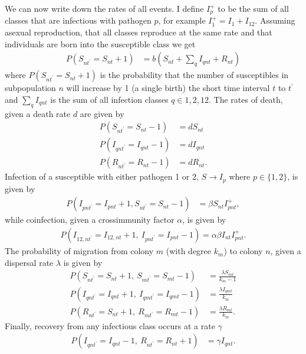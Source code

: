 We can now write down the rates of all events. I define $I^+_p$ to be the sum of all classes that are infectious with pathogen $p$, for example $I^+_1 = I_1 + I_{12}$. Assuming asexual reproduction, that all classes reproduce at the same rate and that individuals are born into the susceptible class we get
\begin{align}
P\left( S_{nt^\prime} = S_{nt} +1\right) &= b\left( S_{nt}+\sum_q I_{qnt} + R_{nt}\right) 
\end{align}
where $P\left( S_{nt^\prime} = S_{nt} +1\right)$ is the probability that the number of susceptibles in subpopulation $n$ will increase by 1 (a single birth) the short time interval $t$ to $t^\prime$ and $\sum_q I_{qnt}$ is the sum of all infection classes $q \in {1, 2, 12}$.
The rates of death, given a death rate $d$ are given by
\begin{align}
P\left( S_{nt^\prime} = S_{nt}-1 \right) &= dS_{nt} \\
P\left( I_{qnt^\prime} = I_{qnt}-1 \right) &= dI_{qnt}\\
P\left( R_{nt^\prime} = R_{nt}-1 \right) &= dR_{nt}.
\end{align}
Infection of a susceptible with either pathogen 1 or 2, $S \rightarrow I_p$ where $p\in \{1,2\}$, is given by
\begin{align}
P\left( I_{pnt^\prime} = I_{pnt}+1, S_{nt^\prime} = S_{nt}-1 \right) &= \beta S_{nt}I^+_{pnt},
\end{align}
while coinfection, given a crossimmunity factor $\alpha$, is given by
\begin{align}
P\left( I_{12,nt^\prime} = I_{12,nt}+1,\: I_{pnt^\prime} = I_{pnt}-1\right) = \alpha\beta I_{nt}I^+_{pnt}.
\end{align}
The probability of migration from colony $m$ (with degree $k_m$) to colony $n$, given a dispersal rate $\lambda$ is given by
\begin{align}
P\left(S_{nt^\prime}=S_{nt}+1,\: S_{mt^\prime} = S_{mt}-1\right) &= \frac{\lambda S_{mt}}{k_m-1}\\
P\left(I_{qnt^\prime}=I_{qnt}+1,\: I_{qmt^\prime} = I_{qmt}-1\right) &= \frac{\lambda I_{qmt}}{k_m}\\
P\left(R_{nt^\prime}=S_{nt}+1,\: R_{mt^\prime} = R_{mt}-1\right) &= \frac{\lambda R_{mt}}{k_m}.
\end{align}
Finally, recovery from any infectious class occurs at a rate $\gamma$
\begin{align}
P\left( I_{qnt^\prime} = I_{qnt}-1,\: R_{nt^\prime} = R_{nt}+1 \right) &= \gamma I_{qnt}.
\end{align}



